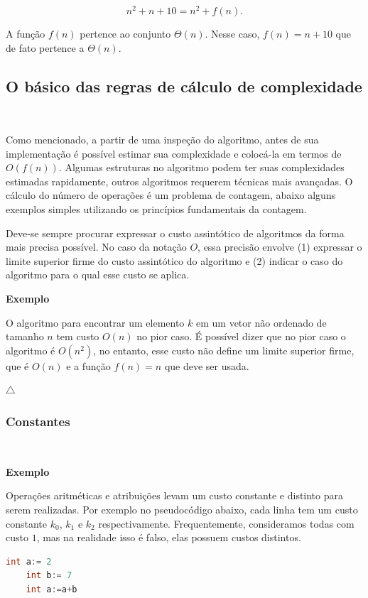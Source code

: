 \[n^2+n+10=n^2+f(n).\]

A função $f(n)$ pertence ao conjunto $\Theta(n)$. Nesse caso, $f(n)=n+10$ que de fato pertence a $\Theta(n)$.

\subsection{O básico das regras de cálculo de complexidade}
\

Como mencionado, a partir de uma inspeção do algoritmo, antes de sua implementação é possível estimar sua complexidade e colocá-la em termos de $O(f(n))$. Algumas estruturas no algoritmo podem ter suas complexidades estimadas rapidamente, outros algoritmos requerem técnicas mais avançadas. O cálculo do número de operações é um problema de contagem, abaixo alguns exemplos simples utilizando os princípios fundamentais da contagem.

Deve-se sempre procurar expressar o custo assintótico de algoritmos da forma mais precisa possível. No caso da notação $O$, essa precisão envolve (1) expressar o limite superior firme do custo assintótico do algoritmo e (2) indicar o caso do algoritmo para o qual esse custo se aplica.

\textbf{Exemplo}

O algoritmo para encontrar um elemento $k$ em um vetor não ordenado de tamanho $n$ tem custo $O(n)$ no pior caso. É possível dizer que no pior caso o algoritmo é $O(n^2)$, no entanto, esse custo não define um limite superior firme, que é $O(n)$ e a função $f(n)=n$ que deve ser usada.

{\raggedleft $\bigtriangleup$ \par}

\subsubsection{Constantes}
\

\textbf{Exemplo}

Operações aritméticas e atribuições levam um custo constante e distinto para serem realizadas. Por exemplo no pseudocódigo abaixo, cada linha tem um custo constante $k_0$, $k_1$ e $k_2$ respectivamente. Frequentemente, consideramos todas com custo $1$, mas na realidade isso é falso, elas possuem custos distintos.

\begin{lstlisting}[language=C, frame=single]
    int a:= 2
    int b:= 7
    int a:=a+b
\end{lstlisting}

